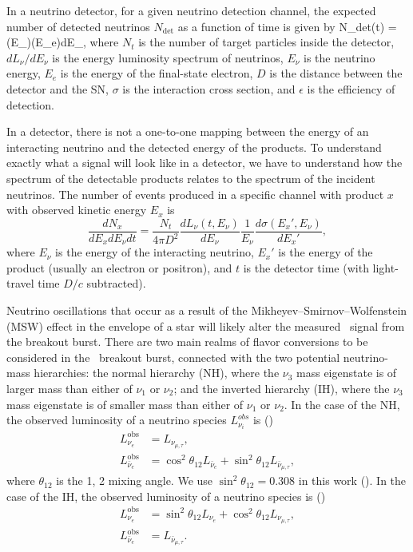 In a neutrino detector, for a given neutrino detection channel, the
expected number of detected neutrinos $N_{\textrm{det}}$ as a function of time is given by
\beq
\label{eq:Nint}
N_{\textrm{det}}(t) =   \int {}\sigma(E_\nu)\epsilon(E_e)dE_\nu,
\eeq
where $N_t$ is the number of target particles inside the
detector, $dL_\nu/dE_\nu$
is the energy luminosity spectrum of neutrinos, $E_\nu$ is the
neutrino energy, $E_e$ is the energy of the final-state electron, 
$D$ is the distance between the detector and the SN, 
$\sigma$ is the interaction cross section, and $\epsilon$ is
the efficiency of detection.

In a detector, there is not a one-to-one mapping between the energy
of an interacting neutrino and the detected energy of the products.
To understand exactly what
a signal will look like in a detector, we have to understand how the
spectrum of the detectable products relates to the spectrum of the
incident neutrinos.  The number of events produced in a specific
channel with product $x$ with observed kinetic energy $E_x$
is
\begin{equation}
\frac{dN_x}{dE_x dE_\nu dt} = \frac{N_t}{4\pi D^2} 
\frac{dL_\nu(t,E_\nu)}{dE_\nu}\frac{1}{E_\nu} \frac{d\sigma
(E_{x}',E_\nu)}{dE_{x}'}, %
\end{equation}
where $E_\nu$ is the energy of the interacting neutrino, $E_x'$ is
the energy of the product (usually an electron or positron),
and $t$ is the detector time (with light-travel time $D/c$ subtracted).  

Neutrino oscillations that occur as a result of the
Mikheyev--Smirnov--Wolfenstein (MSW) effect 
in the envelope
of a star will likely alter the measured \nue\ signal from the
breakout burst.  There are two main realms of flavor conversions to be
considered in the \nue\ breakout burst, connected with the two
potential neutrino-mass hierarchies: the normal hierarchy (NH), 
where the $\nu_3$ mass
eigenstate is of larger mass than either of $\nu_1$ or $\nu_2$; and
the inverted hierarchy (IH), where the $\nu_3$ mass
eigenstate is of smaller mass than either of $\nu_1$ or $\nu_2$. In
the case of the NH, the observed luminosity of a neutrino species
$L^{obs}_{\nu_i}$ is (\citealt{mirizzietal2015})
\begin{align}
L^{\textrm{obs}}_{\nu_e} &= L_{\nu_{\mu,\tau}}, \\
L^{\textrm{obs}}_{\bar \nu_e} &= \cos^2{\theta_{12}}L_{\bar \nu_e}
+ \sin^2{\theta_{12}}L_{\bar \nu_{\mu,\tau}},
\end{align}
where $\theta_{12}$ is the 1, 2 mixing angle.  We use
$\sin^2{\theta_{12}} = 0.308$ in this work (\citealt{oliveetal2014}).
In the case of the IH, the observed luminosity of a neutrino species
is (\citealt{mirizzietal2015})
\begin{align}
L^{\textrm{obs}}_{\nu_e} &= \sin^2{\theta_{12}}L_{\nu_e}
+ \cos^2{\theta_{12}}L_{\nu_{\mu,\tau}}, \\
L^{\textrm{obs}}_{\bar \nu_e} &= L_{\bar \nu_{\mu,\tau}}. \label{eq:anue_ih}
\end{align}


